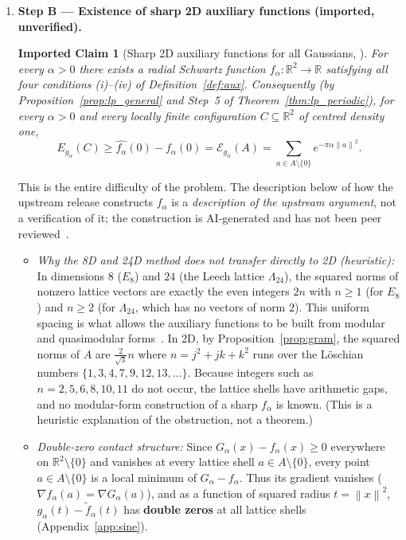 \documentclass[11pt, a4paper]{article}
\newtheorem{importedclaim}[theorem]{Imported Claim}
\theoremstyle{definition}
\theoremstyle{remark}
\newcommand{\R}{\mathbb{R}}
\newcommand{\Ecal}{\mathcal{E}}
\newcommand{\norm}[1]{\left\lVert #1 \right\rVert}
\begin{document}
\begin{enumerate}[label=\textbf{\arabic*.}]
    \item \textbf{Step B --- Existence of sharp 2D auxiliary functions (imported, unverified).}
    \begin{importedclaim}[Sharp 2D auxiliary functions for all Gaussians, \cite{OAI26}]
    \label{claim:gauss_imported}
    For every $\alpha > 0$ there exists a radial Schwartz function $f_\alpha : \R^2 \to \R$ satisfying all four conditions (i)--(iv) of Definition~\ref{def:aux}. Consequently (by Proposition~\ref{prop:lp_general} and Step~5 of Theorem~\ref{thm:lp_periodic}), for every $\alpha > 0$ and every locally finite configuration $C \subseteq \R^2$ of centred density one,
    \begin{equation}
    \label{eq:gauss_bound}
    E_{g_\alpha}(C) \ge \widehat{f_\alpha}(0) - f_\alpha(0) = \Ecal_{g_\alpha}(A) = \sum_{a \in A \setminus \{0\}} e^{-\pi \alpha \norm{a}^2}.
    \end{equation}
    \end{importedclaim}
    \noindent This is the entire difficulty of the problem. The description below of how the upstream release constructs $f_\alpha$ is a \emph{description of the upstream argument}, not a verification of it; the construction is AI-generated and has not been peer reviewed~\cite{repo}.
    \begin{itemize}
        \item \textit{Why the 8D and 24D method does not transfer directly to 2D (heuristic):} In dimensions $8$ ($E_8$) and $24$ (the Leech lattice $\Lambda_{24}$), the squared norms of nonzero lattice vectors are exactly the even integers $2n$ with $n \ge 1$ (for $E_8$) and $n \ge 2$ (for $\Lambda_{24}$, which has no vectors of norm $2$). This uniform spacing is what allows the auxiliary functions to be built from modular and quasimodular forms~\cite{Viazovska17, CKMRV22}. In 2D, by Proposition~\ref{prop:gram}, the squared norms of $A$ are $\frac{2}{\sqrt{3}} n$ where $n = j^2 + j k + k^2$ runs over the L\"oschian numbers $\{1, 3, 4, 7, 9, 12, 13, \dots\}$. Because integers such as $n = 2, 5, 6, 8, 10, 11$ do not occur, the lattice shells have arithmetic gaps, and no modular-form construction of a sharp $f_\alpha$ is known. (This is a heuristic explanation of the obstruction, not a theorem.)
        \item \textit{Double-zero contact structure:} Since $G_\alpha(x) - f_\alpha(x) \ge 0$ everywhere on $\R^2 \setminus \{0\}$ and vanishes at every lattice shell $a \in A \setminus \{0\}$, every point $a \in A \setminus \{0\}$ is a local minimum of $G_\alpha - f_\alpha$. Thus its gradient vanishes ($\nabla f_\alpha(a) = \nabla G_\alpha(a)$), and as a function of squared radius $t = \norm{x}^2$, $g_\alpha(t) - \tilde{f}_\alpha(t)$ has \textbf{double zeros} at all lattice shells (Appendix~\ref{app:sine}).

\end{itemize}
\end{enumerate}
\end{document}
